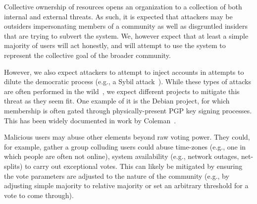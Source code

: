 Collective ownership of resources opens an organization to a collection of both
internal and external threats. As such, it is expected that attackers may be
outsiders impersonating members of a community as well as disgruntled insiders
that are trying to subvert the system. We, however expect that at least a simple
majority of users will act honestly, and will attempt to use the system to 
represent the collective goal of the broader community.

However, we also expect attackers to attempt to inject accounts in attempts to
dilute the democratic process (e.g., a Sybil attack~\cite{sybil1, sybil2}).
While these types of attacks are often performed in the wild~\cite{tor-sybil},
we expect different projects to mitigate this threat as they seem fit. One
example of it is the  Debian project, for which membership is often gated
through physically-present PGP key signing processes. This has been widely
documented in work by Coleman~\cite{coleman-oss}. 

Malicious users may abuse other elements beyond raw voting power. They could,
for example, gather a group colluding users could abuse time-zones (e.g., one in
which people are often not online), system availability (e.g., network outages,
net-splits) to carry out exceptional votes. This can likely be mitigated by
ensuring the vote parameters are adjusted to the nature of the community (e.g.,
by adjusting simple majority to relative majority or set an arbitrary threshold
for a vote to come through).

